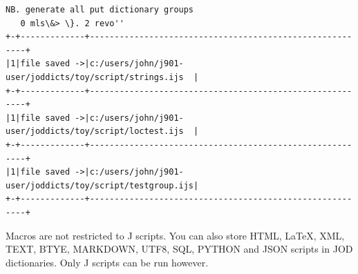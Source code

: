 \documentclass[11pt,letter,landscape]{article}
\begin{document}
    \begin{Verbatim}[commandchars=\\\{\}]
   NB. generate all put dictionary groups
   0 mls\&> \}. 2 revo'' 
+-+-------------+---------------------------------------------------------+
|1|file saved ->|c:/users/john/j901-user/joddicts/toy/script/strings.ijs  |
+-+-------------+---------------------------------------------------------+
|1|file saved ->|c:/users/john/j901-user/joddicts/toy/script/loctest.ijs  |
+-+-------------+---------------------------------------------------------+
|1|file saved ->|c:/users/john/j901-user/joddicts/toy/script/testgroup.ijs|
+-+-------------+---------------------------------------------------------+

    \end{Verbatim}

    Macros are not restricted to J scripts. You can also store HTML, LaTeX,
XML, TEXT, BTYE, MARKDOWN, UTF8, SQL, PYTHON and JSON scripts in JOD
dictionaries. Only J scripts can be run however.
\end{document}
